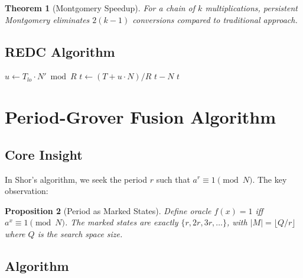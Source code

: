 \documentclass[11pt,a4paper]{article}
\newtheorem{theorem}{Theorem}
\newtheorem{proposition}[theorem]{Proposition}
\begin{document}
\begin{theorem}[Montgomery Speedup]
For a chain of $k$ multiplications, persistent Montgomery eliminates $2(k-1)$ conversions compared to traditional approach.
\end{theorem}

\subsection{REDC Algorithm}

\begin{algorithm}
\caption{Montgomery Reduction}
\begin{algorithmic}[1]
    \State $u \gets T_{lo} \cdot N' \bmod R$ 
    \State $t \gets (T + u \cdot N) / R$
        \State \Return $t - N$
    \Else
        \State \Return $t$
    \EndIf
\EndProcedure
\end{algorithmic}
\end{algorithm}

\section{Period-Grover Fusion Algorithm}

\subsection{Core Insight}

In Shor's algorithm, we seek the period $r$ such that $a^r \equiv 1 \pmod{N}$. The key observation:

\begin{proposition}[Period as Marked States]
Define oracle $f(x) = 1$ iff $a^x \equiv 1 \pmod{N}$. The marked states are exactly $\{r, 2r, 3r, \ldots\}$, with $|M| = \lfloor Q/r \rfloor$ where $Q$ is the search space size.
\end{proposition}

\subsection{Algorithm}
\end{document}
